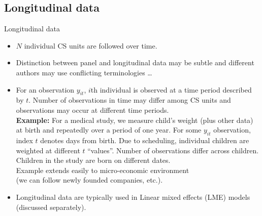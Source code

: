 \documentclass[usenames,dvipsnames]{beamer}
\begin{document}
\subsection*{Longitudinal data}
\begin{frame}{Longitudinal data}
\footnotesize
\begin{itemize}
\item $N$ individual CS units are followed over time.
\medskip
\item Distinction between panel and longitudinal data may be subtle and different authors may use conflicting terminologies \dots
\medskip
\item For an observation $y_{it}$, $i$th individual is observed at a time period described by $t$. Number of observations in time may differ among CS units and observations may occur at different time periods. \\ \medskip 
\textbf{Example:} For a medical study, we measure child's weight (plus other data) at birth and repeatedly over a period of one year. For some $y_{it}$ observation, index $t$ denotes days from birth. Due to scheduling, individual children are weighted at different $t$ ``values''. Number of observations differ across children. Children in the study are born on different dates. \\ \medskip Example extends easily to micro-economic environment \\(we can follow newly founded companies, etc.).
\medskip
\item Longitudinal data are typically used in Linear mixed effects (LME) models (discussed separately).
\end{itemize}
\end{frame}
\end{document}
